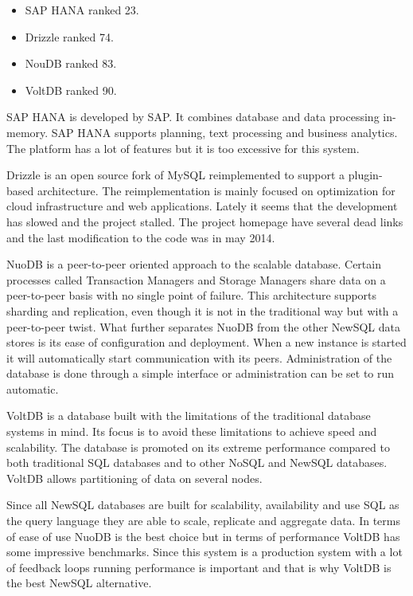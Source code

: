 \begin{itemize}
\item SAP HANA ranked 23.
\item Drizzle ranked 74.
\item NouDB ranked 83.
\item VoltDB ranked 90.
\end{itemize}

SAP HANA is developed by SAP.
It combines database and data processing in-memory.
SAP HANA supports planning, text processing and business analytics.
The platform has a lot of features but it is too excessive for this system.

Drizzle is an open source fork of MySQL reimplemented to support a plugin-based architecture.
The reimplementation is mainly focused on optimization for cloud infrastructure and web applications.
Lately it seems that the development has slowed and the project stalled.
The project homepage have several dead links and the last modification to the code was in may 2014.

NuoDB is a peer-to-peer oriented approach to the scalable database. Certain processes called Transaction Managers and Storage Managers share data on a peer-to-peer basis with no single point of failure.
This architecture supports sharding and replication, even though it is not in the traditional way but with a peer-to-peer twist.
What further separates NuoDB from the other NewSQL data stores is its ease of configuration and deployment. When a new instance is started it will automatically start communication with its peers. Administration of the database is done through a simple interface or administration can be set to run automatic.

VoltDB is a database built with the limitations of the traditional database systems in mind. Its focus is to avoid these limitations to achieve speed and scalability. The database is promoted on its extreme performance  compared to both traditional SQL databases and to other NoSQL and NewSQL databases. VoltDB allows partitioning of data on several nodes.

Since all NewSQL databases are built for scalability, availability and use SQL as the query language they are able to scale, replicate and aggregate data.
In terms of ease of use NuoDB is the best choice but in terms of performance VoltDB has some impressive benchmarks.
Since this system is a production system with a lot of feedback loops running performance is important and that is why VoltDB is the best NewSQL alternative.

